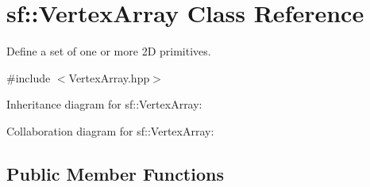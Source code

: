 \hypertarget{classsf_1_1_vertex_array}{}\section{sf\+:\+:Vertex\+Array Class Reference}
\label{classsf_1_1_vertex_array}


Define a set of one or more 2D primitives.  




{\ttfamily \#include $<$Vertex\+Array.\+hpp$>$}



Inheritance diagram for sf\+:\+:Vertex\+Array\+:


Collaboration diagram for sf\+:\+:Vertex\+Array\+:
\subsection*{Public Member Functions}

